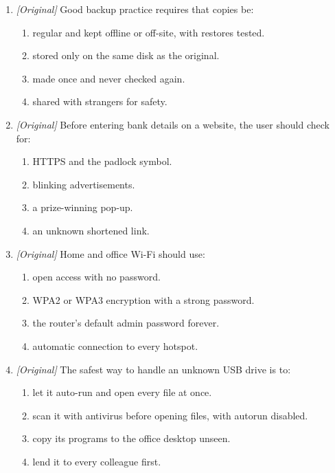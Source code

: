 \documentclass[11pt]{article}
\begin{document}
\begin{enumerate}[label=\textbf{Q\arabic*.}, leftmargin=*]
\begin{enumerate}[label=\Alph*.]
    \item Availability
    \item Authentication
  \end{enumerate}
\item \textit{[Original]} Good backup practice requires that copies be:
  \begin{enumerate}[label=\Alph*.]
    \item regular and kept offline or off-site, with restores tested.
    \item stored only on the same disk as the original.
    \item made once and never checked again.
    \item shared with strangers for safety.
  \end{enumerate}
\item \textit{[Original]} Before entering bank details on a website, the user
  should check for:
  \begin{enumerate}[label=\Alph*.]
    \item HTTPS and the padlock symbol.
    \item blinking advertisements.
    \item a prize-winning pop-up.
    \item an unknown shortened link.
  \end{enumerate}
\item \textit{[Original]} Home and office Wi-Fi should use:
  \begin{enumerate}[label=\Alph*.]
    \item open access with no password.
    \item WPA2 or WPA3 encryption with a strong password.
    \item the router's default admin password forever.
    \item automatic connection to every hotspot.
  \end{enumerate}
\item \textit{[Original]} The safest way to handle an unknown USB drive is to:
  \begin{enumerate}[label=\Alph*.]
    \item let it auto-run and open every file at once.
    \item scan it with antivirus before opening files, with autorun disabled.
    \item copy its programs to the office desktop unseen.
    \item lend it to every colleague first.
  \end{enumerate}

\end{enumerate}
\end{document}
